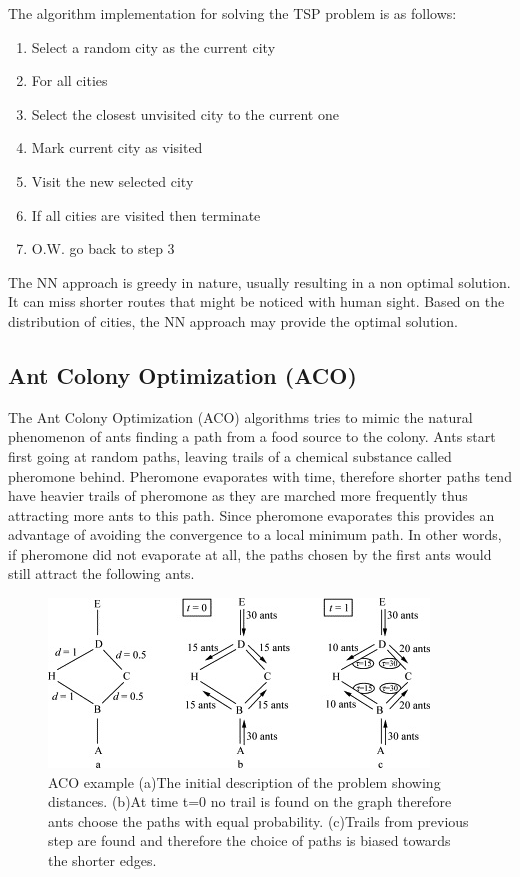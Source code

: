 \documentclass[twocolumn]{article}
\begin{document}
	The algorithm implementation for solving the TSP problem is as follows:
	\begin{enumerate}
		\item Select a random city as the current city
		\item For all cities
		\item Select the closest unvisited city to the current one
		\item Mark current city as visited
		\item Visit the new selected city
		\item If all cities are visited then terminate
		\item O.W. go back to step 3
	\end{enumerate}
	
	The NN approach is greedy in nature, usually resulting in a non optimal solution. It can miss shorter routes that might be noticed with human sight. Based on the distribution of cities, the NN approach may provide the optimal solution.
	
	\subsection{Ant Colony Optimization (ACO)}
	The Ant Colony Optimization (ACO) algorithms tries to mimic the natural phenomenon of ants finding a path from a food source to the colony. Ants start first going at random paths, leaving trails of a chemical substance called pheromone behind. Pheromone evaporates with time, therefore shorter paths tend have heavier trails of pheromone as they are marched more frequently thus attracting more ants to this path. Since pheromone evaporates this provides an advantage of avoiding the convergence to a local minimum path. In other words, if pheromone did not evaporate at all, the paths chosen by the first ants would still attract the following ants.
	
	\begin{figure}[h!]
		\centering
		\includegraphics[scale=0.8]{./ACOexample.jpg}
		\caption{ACO example\cite{ACOExample} (a)The initial description of the problem showing distances. (b)At time t=0 no trail is found on the graph therefore ants choose the paths with equal probability. (c)Trails from previous step are found and therefore the choice of paths is biased towards the shorter edges.}
		\label{fig:ACOexample}
	\end{figure}
	
\end{document}
